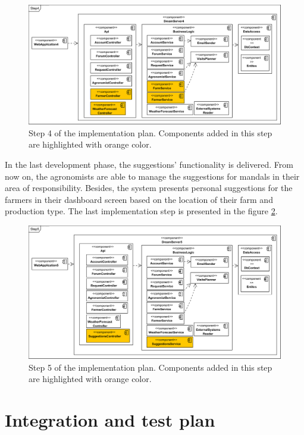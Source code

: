 \begin{figure}[H]
    \centering
    \includegraphics[width=\textwidth]
    {diagrams/implementation-plan/Step4.png}
    \caption{Step 4 of the implementation plan. Components added in this step are highlighted with orange color.}
    \label{fig:step4}
\end{figure}

In the last development phase, the suggestions' functionality is delivered. From now on, the agronomists are able to manage the suggestions for mandals in their area of responsibility. Besides, the system presents personal suggestions for the farmers in their dashboard screen based on the location of their farm and production type. The last implementation step is presented in the figure \ref{fig:step5}.

\begin{figure}[H]
    \centering
    \includegraphics[width=\textwidth]
    {diagrams/implementation-plan/Step5.png}
    \caption{Step 5 of the implementation plan. Components added in this step are highlighted with orange color.}
    \label{fig:step5}
\end{figure}

\section{Integration and test plan}